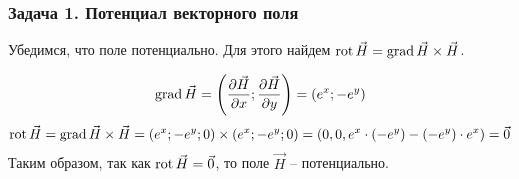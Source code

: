 \begin{frame}\frametitle{Задача 1. Потенциал векторного поля}
Убедимся, что поле потенциально.
Для этого найдем $\operatorname{rot} \vec H = \operatorname{grad} \vec H \times \vec H$.

\[
  \operatorname{grad} \vec H = 
  \left( \frac{\partial \vec H}{\partial x};  \frac{\partial \vec H}{\partial y}\right) =
  \left( e^x; -e^{y} \right)
\]
\[
  \operatorname{rot} \vec H = 
  \operatorname{grad} \vec H \times \vec H = 
  (e^x; -e^y; 0) \times (e^x; -e^y; 0) =
  (0, 0, e^x \cdot (-e^y) - (-e^y) \cdot e^x) =
  \vec 0
\]
Таким образом, так как $\operatorname{rot} \vec H = \vec 0$,
  то поле $\vec H$ -- потенциально.
\end{frame}   
